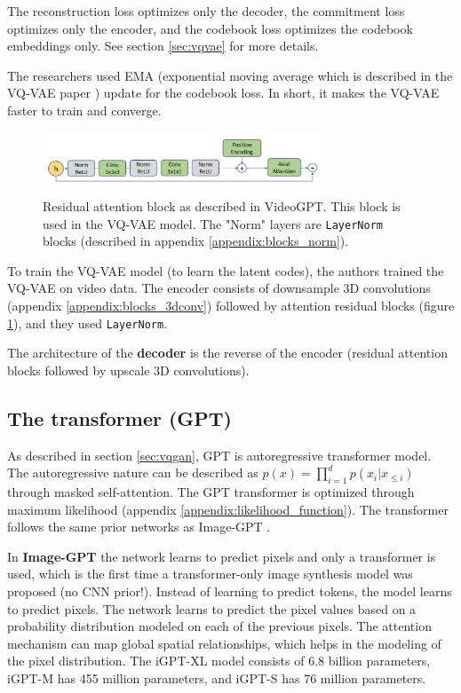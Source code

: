 The reconstruction loss optimizes only the decoder, the commitment loss optimizes only the encoder, and the codebook loss optimizes the codebook embeddings only. See section \ref{sec:vqvae} for more details.

The researchers used EMA (exponential moving average which is described in the VQ-VAE paper \cite{vqvae}) update for the codebook loss. In short, it makes the VQ-VAE faster to train and converge.

\begin{figure}
    \centering
    \includegraphics[width=0.75\textwidth]{images/video_gpt/res_atten_block.png}
    \caption{Residual attention block as described in VideoGPT. This block is used in the VQ-VAE model. The "Norm" layers are \texttt{LayerNorm} blocks (described in appendix \ref{appendix:blocks_norm}).}
    \label{fig:videogpt_res_atten_block}
\end{figure}

To train the VQ-VAE model (to learn the latent codes), the authors trained the VQ-VAE on video data. The encoder consists of downsample 3D convolutions (appendix \ref{appendix:blocks_3dconv}) followed by attention residual blocks (figure \ref{fig:videogpt_res_atten_block}), and they used \texttt{LayerNorm}.

The architecture of the \textbf{decoder} is the reverse of the encoder (residual attention blocks followed by upscale 3D convolutions).

\subsection*{The transformer (GPT)}

As described in section \ref{sec:vqgan}, GPT is autoregressive transformer model. The autoregressive nature can be described as $p(x) = \prod_{i=1}^{d} p(x_i | x_{\leq i})$ through masked self-attention. The GPT transformer is optimized through maximum likelihood (appendix \ref{appendix:likelihood_function}). The transformer follows the same prior networks as Image-GPT \cite{imagegpt}.

In \textbf{Image-GPT} the network learns to predict pixels and only a transformer is used, which is the first time a transformer-only image synthesis model was proposed (no CNN prior!). Instead of learning to predict tokens, the model learns to predict pixels. The network learns to predict the pixel values based on a probability distribution modeled on each of the previous pixels. The attention mechanism can map global spatial relationships, which helps in the modeling of the pixel distribution. The iGPT-XL model consists of 6.8 billion parameters, iGPT-M has 455 million parameters, and iGPT-S has 76 million parameters. 

